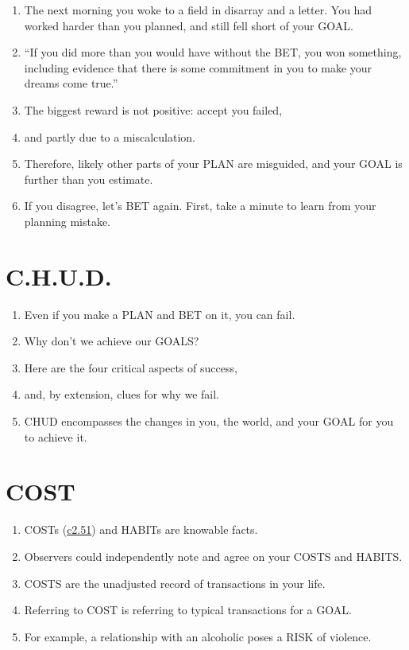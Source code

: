\documentclass[
]{book}
\providecommand{\tightlist}{%
  \setlength{\itemsep}{0pt}\setlength{\parskip}{0pt}}
\begin{document}
\begin{enumerate}
\def\labelenumi{\arabic{enumi}.}
\setcounter{enumi}{31}
\tightlist
\item
  The next morning you woke to a field in disarray and a letter. You had
  worked harder than you planned, and still fell short of your GOAL.
\item
  ``If you did more than you would have without the BET, you won
  something, including evidence that there is some commitment in you
  to make your dreams come true.''
\item
  The biggest reward is not positive: accept you failed,
\item
  and partly due to a miscalculation.
\item
  Therefore, likely other parts of your PLAN are misguided, and your
  GOAL is further than you estimate.
\item
  If you disagree, let's BET again. First, take a minute to learn from your
  planning mistake.
\end{enumerate}

\hypertarget{c.h.u.d.}{%
\section{C.H.U.D.}\label{c.h.u.d.}}

\begin{enumerate}
\def\labelenumi{\arabic{enumi}.}
\setcounter{enumi}{37}
\tightlist
\item
  Even if you make a PLAN and BET on it, you can fail.
\item
  Why don't we achieve our GOALS?
\item
  Here are the four critical aspects of success,
\item
  and, by extension, clues for why we fail.
\item
  CHUD encompasses the changes in you, the world, and your GOAL for
  you to achieve it.
\end{enumerate}

\hypertarget{cost}{%
\section{COST}\label{cost}}

\begin{enumerate}
\def\labelenumi{\arabic{enumi}.}
\setcounter{enumi}{42}
\tightlist
\item
  COSTs (\protect\hyperlink{self-1}{c2.51}) and HABITs are knowable facts.
\item
  Observers could independently note and agree on your COSTS and HABITS.
\item
  COSTS are the unadjusted record of transactions in your life.
\item
  Referring to COST is referring to typical transactions for a GOAL.
\item
  For example, a relationship with an alcoholic poses a RISK of violence.
\end{enumerate}
\end{document}
